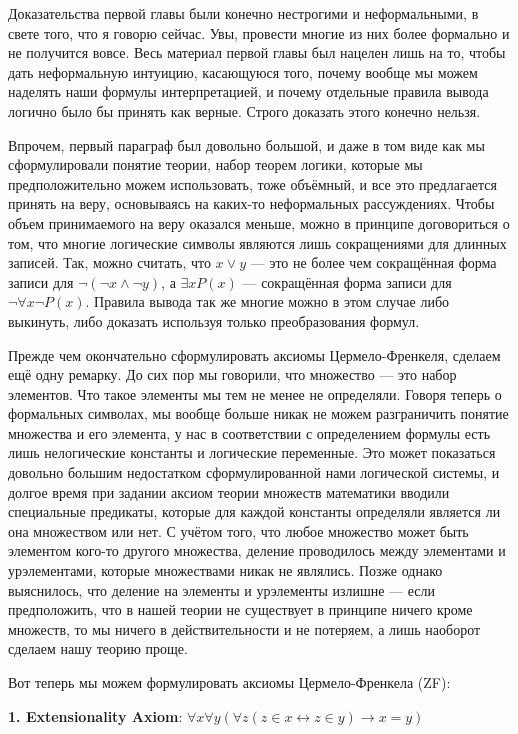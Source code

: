 Доказательства первой главы были конечно нестрогими и неформальными, в свете того, что я говорю сейчас. Увы, провести многие из них более формально и не получится вовсе. Весь материал первой главы был нацелен лишь на то, чтобы дать неформальную интуицию, касающуюся того, почему вообще мы можем наделять наши формулы интерпретацией, и почему отдельные правила вывода логично было бы принять как верные. Строго доказать этого конечно нельзя.

Впрочем, первый параграф был довольно большой, и даже в том виде как мы сформулировали понятие теории, набор теорем логики, которые мы предположительно можем использовать, тоже объёмный, и все это предлагается принять на веру, основываясь на каких-то неформальных рассуждениях. Чтобы объем принимаемого на веру оказался меньше, можно в принципе договориться о том, что многие логические символы являются лишь сокращениями для длинных записей. Так, можно считать, что $x\vee y$ — это не более чем сокращённая форма записи для $\neg (\neg x \wedge \neg y)$, а $\exists x P(x)$ — сокращённая форма записи для $\neg \forall x \neg P(x)$. Правила вывода так же многие можно в этом случае либо выкинуть, либо доказать используя только преобразования формул.

Прежде чем окончательно сформулировать аксиомы Цермело-Френкеля, сделаем ещё одну ремарку. До сих пор мы говорили, что множество — это набор элементов. Что такое элементы мы тем не менее не определяли. Говоря теперь о формальных символах, мы вообще больше никак не можем разграничить понятие множества и его элемента, у нас в соответствии с определением формулы есть лишь нелогические константы и логические переменные. Это может показаться довольно большим недостатком сформулированной нами логической системы, и долгое время при задании аксиом теории множеств математики вводили специальные предикаты, которые для каждой константы определяли является ли она множеством или нет. С учётом того, что любое множество может быть элементом кого-то другого множества, деление проводилось между элементами и урэлементами, которые множествами никак не являлись. Позже однако выяснилось, что деление на элементы и урэлементы излишне — если предположить, что в нашей теории не существует в принципе ничего кроме множеств, то мы ничего в действительности и не потеряем, а лишь наоборот сделаем нашу теорию проще.

Вот теперь мы можем формулировать аксиомы Цермело-Френкела (ZF):

{\bfseries 1. Extensionality Axiom}: $\forall x \forall y (\forall z (z \in x \leftrightarrow z \in y) \rightarrow x = y)$

